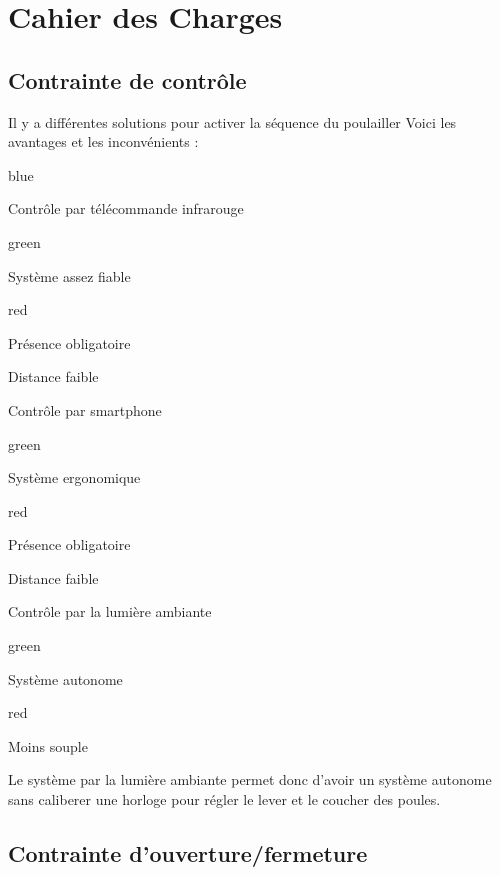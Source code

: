 {\chapter{Cahier des Charges}

\section{Contrainte de contrôle}

Il y a différentes solutions pour activer la séquence du poulailler 
Voici les avantages et les inconvénients :

\begin{items}{blue}{\Triangle}
    \item Contrôle par télécommande infrarouge
    \begin{items}{green}{\Bullet}
        \item Système assez fiable
    \end{items}
    \begin{items}{red}{\Bullet}
        \item Présence obligatoire
        \item Distance faible
    \end{items}
    \item Contrôle par smartphone
    \begin{items}{green}{\Bullet}
        \item Système ergonomique
    \end{items}
    \begin{items}{red}{\Bullet}
        \item Présence obligatoire
        \item Distance faible
    \end{items}
    \item Contrôle par la lumière ambiante
    \begin{items}{green}{\Bullet}
        \item Système autonome
    \end{items}
    \begin{items}{red}{\Bullet}
        \item Moins souple
    \end{items}
\end{items}


Le système par la lumière ambiante permet donc d'avoir un système autonome sans caliberer une horloge pour régler le lever et le coucher des poules.

\section{Contrainte d'ouverture/fermeture}

}

